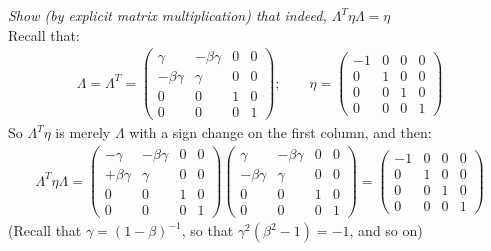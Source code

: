 \documentclass[../template.tex]{subfiles}
\begin{document}
\textit{Show (by explicit matrix multiplication) that indeed, $\Lambda^T \eta \Lambda = \eta $}\\

Recall that:
\begin{align*}
    \Lambda = \Lambda^T = \left(\begin{array}{cccc}
    \gamma & -\beta \gamma & 0 & 0 \\ 
    -\beta \gamma & \gamma & 0 & 0 \\ 
    0 & 0 & 1 & 0 \\ 
    0 & 0 & 0 & 1
    \end{array}\right); \qquad \eta = \left(\begin{array}{cccc}
    -1 & 0 & 0 & 0 \\ 
    0 & 1 & 0 & 0 \\ 
    0 & 0 & 1 & 0 \\ 
    0 & 0 & 0 & 1
    \end{array}\right)
\end{align*}
So $\Lambda^T \eta$ is merely $\Lambda$ with a sign change on the first column, and then:
\begin{align*}
    \Lambda^T \eta \Lambda = \left(\begin{array}{cccc}
    -\gamma & -\beta \gamma & 0 & 0 \\ 
    +\beta \gamma & \gamma & 0 & 0 \\ 
    0 & 0 & 1 & 0 \\ 
    0 & 0 & 0 & 1
    \end{array}\right)
    \left(\begin{array}{cccc}
    \gamma & -\beta \gamma & 0 & 0 \\ 
    -\beta \gamma & \gamma & 0 & 0 \\ 
    0 & 0 & 1 & 0 \\ 
    0 & 0 & 0 & 1
    \end{array}\right) = \left(\begin{array}{cccc}
    -1 & 0 & 0 & 0 \\ 
    0 & 1 & 0 & 0 \\ 
    0 & 0 & 1 & 0 \\ 
    0 & 0 & 0 & 1
    \end{array}\right)
\end{align*}  
(Recall that $\gamma = (1-\beta)^{-1}$, so that $\gamma^2 (\beta^2 -1) = -1$, and so on)
\end{document}
